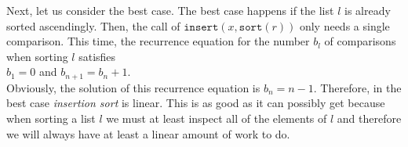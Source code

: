 Next, let us consider the best case.  The best case happens if the list $l$ is already sorted
ascendingly.  Then, the call of 
$\mathtt{insert}(x,\mathtt{sort}(r))$ only needs a single comparison.  This time, the recurrence
equation for the number $b_l$ of comparisons when sorting $l$ satisfies
 \\[0.2cm]
\hspace*{1.3cm}
$b_1 = 0$ \quad and \quad $b_{n+1} = b_n + 1$. 
\\[0.2cm]
Obviously, the solution of this recurrence equation is $b_n = n-1$.  Therefore, in the best case
\emph{insertion sort} is linear.  This is as good as it can possibly get because when sorting a list $l$ we
must at least inspect all of the elements of $l$ and therefore we will always have at least a linear
amount of work to do.


